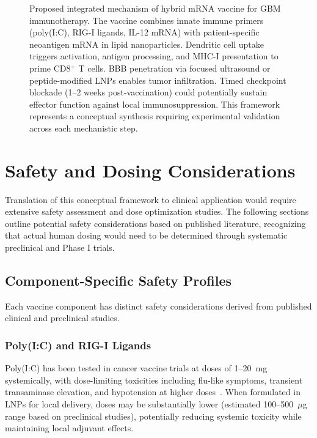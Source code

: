 \documentclass[12pt]{article}
\begin{document}
\begin{figure}[!htbp]
\begin{tikzpicture}
\end{tikzpicture}
\caption{Proposed integrated mechanism of hybrid mRNA vaccine for GBM immunotherapy. The vaccine combines innate immune primers (poly(I:C), RIG-I ligands, IL-12 mRNA) with patient-specific neoantigen mRNA in lipid nanoparticles. Dendritic cell uptake triggers activation, antigen processing, and MHC-I presentation to prime CD8$^+$ T cells. BBB penetration via focused ultrasound or peptide-modified LNPs enables tumor infiltration. Timed checkpoint blockade (1--2 weeks post-vaccination) could potentially sustain effector function against local immunosuppression. This framework represents a conceptual synthesis requiring experimental validation across each mechanistic step.}
\label{fig:mechanism}
\end{figure}

\section{Safety and Dosing Considerations}

Translation of this conceptual framework to clinical application would require extensive safety assessment and dose optimization studies. The following sections outline potential safety considerations based on published literature, recognizing that actual human dosing would need to be determined through systematic preclinical and Phase I trials.

\subsection{Component-Specific Safety Profiles}
Each vaccine component has distinct safety considerations derived from published clinical and preclinical studies.

\subsubsection{Poly(I:C) and RIG-I Ligands}
Poly(I:C) has been tested in cancer vaccine trials at doses of 1--20~mg systemically, with dose-limiting toxicities including flu-like symptoms, transient transaminase elevation, and hypotension at higher doses~\citep{ammi2015}. When formulated in LNPs for local delivery, doses may be substantially lower (estimated 100--500~$\mu$g range based on preclinical studies), potentially reducing systemic toxicity while maintaining local adjuvant effects.
\end{document}
